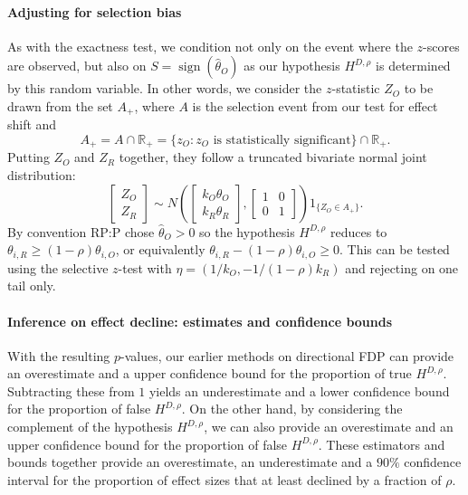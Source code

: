 \documentclass[11pt]{article}
\theoremstyle{definition}
\theoremstyle{custom}
\newcommand{\RR}{\mathbb{R}}
\DeclareMathOperator{\sgn}{sign}
\newcommand{\htheta}{\hat{\theta}}
\begin{document}
  \paragraph{Adjusting for selection bias} As with the exactness test, we condition not only on the event where the $z$-scores are observed, but also on $S = \sgn(\htheta_O)$ as our hypothesis $H^{D,\rho}$ is determined by this random variable. In other words, we consider the $z$-statistic $Z_O$ to be drawn from the set $A_+$, where $A$ is the selection event from our test for effect shift and
  \[
    A_+ = A \cap \RR_+ = \{z_O: z_O \text{ is statistically significant}\} \cap \RR_+.
  \]
  Putting $Z_O$ and $Z_R$ together, they follow a truncated bivariate normal joint distribution:
  \[
    \begin{bmatrix}
      Z_O \\ Z_R
    \end{bmatrix} \sim N\left(\begin{bmatrix}
      k_O \theta_O \\ k_R \theta_R
    \end{bmatrix}, \begin{bmatrix}
      1 & 0 \\ 0 & 1
    \end{bmatrix}\right) 1_{\{Z_O \in A_+\}}.
  \]
  By convention RP:P chose $\htheta_O > 0$ so the hypothesis $H^{D,\rho}$ reduces to $\theta_{i,R} \ge (1-\rho) \theta_{i,O}$, or equivalently $\theta_{i,R} - (1-\rho) \theta_{i,O} \ge 0$. This can be tested using the selective $z$-test with $\eta = (1/k_O, -1/(1-\rho)k_R)$ and rejecting on one tail only.

  \paragraph{Inference on effect decline: estimates and confidence bounds} With the resulting $p$-values, our earlier methods on directional FDP can provide an overestimate and a upper confidence bound for the proportion of true $H^{D,\rho}$. Subtracting these from $1$ yields an underestimate and a lower confidence bound for the proportion of false $H^{D,\rho}$. On the other hand, by considering the complement of the hypothesis $H^{D,\rho}$, we can also provide an overestimate and an upper confidence bound for the proportion of false $H^{D,\rho}$. These estimators and bounds together provide an overestimate, an underestimate and a $90\%$ confidence interval for the proportion of effect sizes that at least declined by a fraction of $\rho$.
\end{document}
